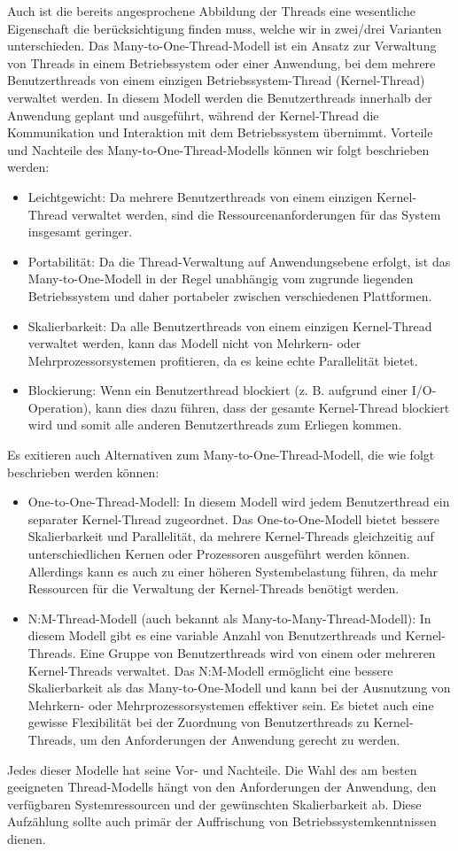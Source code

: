 Auch ist die bereits angesprochene Abbildung der Threads eine wesentliche Eigenschaft die berücksichtigung finden muss, welche wir in zwei/drei Varianten unterschieden. Das Many-to-One-Thread-Modell ist ein Ansatz zur Verwaltung von Threads in einem Betriebssystem oder einer Anwendung, bei dem mehrere Benutzerthreads von einem einzigen Betriebssystem-Thread (Kernel-Thread) verwaltet werden. In diesem Modell werden die Benutzerthreads innerhalb der Anwendung geplant und ausgeführt, während der Kernel-Thread die Kommunikation und Interaktion mit dem Betriebssystem übernimmt. Vorteile und Nachteile des Many-to-One-Thread-Modells können wir folgt beschrieben werden:
\begin{itemize}
\item Leichtgewicht: Da mehrere Benutzerthreads von einem einzigen Kernel-Thread verwaltet werden, sind die Ressourcenanforderungen für das System insgesamt geringer.
\item Portabilität: Da die Thread-Verwaltung auf Anwendungsebene erfolgt, ist das Many-to-One-Modell in der Regel unabhängig vom zugrunde liegenden Betriebssystem und daher portabeler zwischen verschiedenen Plattformen.
\item Skalierbarkeit: Da alle Benutzerthreads von einem einzigen Kernel-Thread verwaltet werden, kann das Modell nicht von Mehrkern- oder Mehrprozessorsystemen profitieren, da es keine echte Parallelität bietet.
\item Blockierung: Wenn ein Benutzerthread blockiert (z. B. aufgrund einer I/O-Operation), kann dies dazu führen, dass der gesamte Kernel-Thread blockiert wird und somit alle anderen Benutzerthreads zum Erliegen kommen.
\end{itemize}
Es exitieren auch Alternativen zum Many-to-One-Thread-Modell, die wie folgt beschrieben werden können:
\begin{itemize}
\item One-to-One-Thread-Modell: In diesem Modell wird jedem Benutzerthread ein separater Kernel-Thread zugeordnet. Das One-to-One-Modell bietet bessere Skalierbarkeit und Parallelität, da mehrere Kernel-Threads gleichzeitig auf unterschiedlichen Kernen oder Prozessoren ausgeführt werden können. Allerdings kann es auch zu einer höheren Systembelastung führen, da mehr Ressourcen für die Verwaltung der Kernel-Threads benötigt werden.
\item N:M-Thread-Modell (auch bekannt als Many-to-Many-Thread-Modell): In diesem Modell gibt es eine variable Anzahl von Benutzerthreads und Kernel-Threads. Eine Gruppe von Benutzerthreads wird von einem oder mehreren Kernel-Threads verwaltet. Das N:M-Modell ermöglicht eine bessere Skalierbarkeit als das Many-to-One-Modell und kann bei der Ausnutzung von Mehrkern- oder Mehrprozessorsystemen effektiver sein. Es bietet auch eine gewisse Flexibilität bei der Zuordnung von Benutzerthreads zu Kernel-Threads, um den Anforderungen der Anwendung gerecht zu werden.
\end{itemize}
Jedes dieser Modelle hat seine Vor- und Nachteile. Die Wahl des am besten geeigneten Thread-Modells hängt von den Anforderungen der Anwendung, den verfügbaren Systemressourcen und der gewünschten Skalierbarkeit ab. Diese Aufzählung sollte auch primär der Auffrischung von Betriebssystemkenntnissen dienen. 

